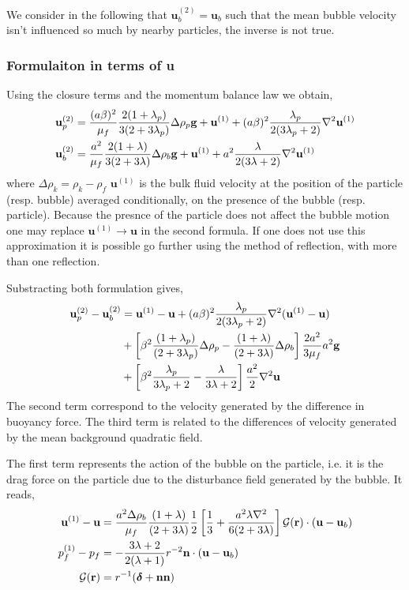 \documentclass[12pt]{My_preprint}
\begin{document}
We consider in the following that $\textbf{u}_b^{(2)} = \textbf{u}_b$ such that the mean bubble velocity isn't influenced so much by nearby particles, the inverse is not true. 
\subsubsection{Formulaiton in terms of \textbf{u}}
Using the closure terms and the momentum balance law we obtain, 
\begin{align}
    \textbf{u}_p^{(2)} 
    &=
    \frac{(a\beta)^2}{\mu_f}
    \frac{2(1+\lambda_p)}{3(2+3\lambda_p)}\Delta\rho_p\textbf{g}
    + \textbf{u}^{(1)}
    + (a\beta)^2 \frac{\lambda_p}{2(3\lambda_p +2)} \mathbf{\nabla}^2 \textbf{u}^{(1)}\\
    \textbf{u}_b^{(2)} 
    &=
    \frac{a^2}{\mu_f}
    \frac{2(1+\lambda)}{3(2+3\lambda)}\Delta\rho_b\textbf{g}
    + \textbf{u}^{(1)}
    + a^2 \frac{\lambda}{2(3\lambda +2)} \mathbf{\nabla}^2 \textbf{u}^{(1)}
\end{align}
where $\Delta\rho_k = \rho_k - \rho_f$ $\textbf{u}^{(1)}$ is the bulk fluid velocity at the position of the particle (resp. bubble) averaged conditionally, on the presence of the bubble (resp. particle). 
Because the presnce of the particle does not affect the bubble motion one may replace $\textbf{u}^{(1)} \to \textbf{u}$ in the second formula.
If one does not use this approximation it is possible go further using the method of reflection, with more than one reflection.  

Substracting both formulation gives, 
\begin{align}
    \textbf{u}_p^{(2)} - \textbf{u}_b^{(2)}
    &=
    \textbf{u}^{(1)} - \textbf{u}
    + (a\beta)^2 \frac{\lambda_p}{2(3\lambda_p +2)} \mathbf{\nabla}^2 (\textbf{u}^{(1)} - \textbf{u})\\
    &+
    \left[\beta^2\frac{(1+\lambda_p)}{(2+3\lambda_p)}\Delta\rho_p  -\frac{(1+\lambda)}{(2+3\lambda)}\Delta\rho_b  \right] \frac{2a^2}{3\mu_f}a^2\textbf{g}\\
    &+ \left[\beta^2\frac{\lambda_p}{3\lambda_p +2} - \frac{\lambda}{3\lambda +2} \right] \frac{a^2}{2}\mathbf{\nabla}^2 \textbf{u}
\end{align}
The second term correspond to the velocity generated by the difference in buoyancy force. 
The third term is related to the differences of velocity generated by the mean background quadratic field. 

The first term represents the action of the bubble on the particle, i.e. it is the drag force on the particle due to the disturbance field generated by the bubble.
It reads, 
\begin{align*}
    \textbf{u}^{(1)} - \textbf{u}
    &=
    \frac{a^2\Delta\rho_b}{\mu_f} \frac{(1+\lambda)}{(2+3\lambda)}\frac{1}{2}\left[
        \frac{1}{3}
        + 
        \frac{a^2\lambda\mathbf{\nabla}^2}{6(2+3\lambda)}
        \right]\mathcal{G}(\textbf{r})\cdot
    (\textbf{u}- \textbf{u}_b)\\
    p_f^{(1)} - p_f
    &=
    -\frac{3\lambda+2}{2(\lambda+1)}r^{-2} \textbf{n}\cdot (\textbf{u}- \textbf{u}_b)\\
    \mathcal{G}(\textbf{r})
    &=
    r^{-1}(\bm\delta + \textbf{nn})
\end{align*} 
\end{document}
